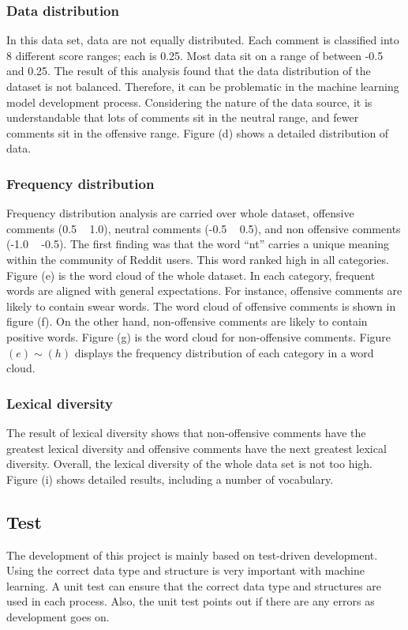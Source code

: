 \documentclass[11pt, natbib=false]{article}
\begin{document}
\subsubsection{Data distribution}
In this data set, data are not equally distributed.
Each comment is classified into 8 different score ranges; each is 0.25.
Most data sit on a range of between -0.5 and 0.25.
The result of this analysis found that the data distribution of the dataset is not balanced.
Therefore, it can be problematic in the machine learning model development process.
Considering the nature of the data source, it is understandable that lots of comments sit in the neutral range, and fewer comments sit in the offensive range.
Figure (d) shows a detailed distribution of data.

\subsubsection{Frequency distribution}
Frequency distribution analysis are carried over whole dataset, offensive comments (0.5 ~ 1.0), neutral comments (-0.5 ~ 0.5), and non offensive comments (-1.0 ~ -0.5).
The first finding was that the word “nt” carries a unique meaning within the community of Reddit users.
This word ranked high in all categories. Figure (e) is the word cloud of the whole dataset.
In each category, frequent words are aligned with general expectations.
For instance, offensive comments are likely to contain swear words. The word cloud of offensive comments is shown in figure (f).
On the other hand, non-offensive comments are likely to contain positive words. Figure (g) is the word cloud for non-offensive comments.
Figure $ (e) \sim (h)$ displays the frequency distribution of each category in a word cloud.

\subsubsection{Lexical diversity}
The result of lexical diversity shows that non-offensive comments have the greatest lexical diversity and offensive comments have the next greatest lexical diversity.
Overall, the lexical diversity of the whole data set is not too high.
Figure (i) shows detailed results, including a number of vocabulary.

\subsection{Test}
The development of this project is mainly based on test-driven development.
Using the correct data type and structure is very important with machine learning.
A unit test can ensure that the correct data type and structures are used in each process.
Also, the unit test points out if there are any errors as development goes on.
\end{document}
